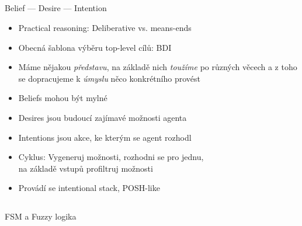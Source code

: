 \documentclass{beamer}
\begin{document}
\subsection{}
\begin{frame}{Belief --- Desire --- Intention}
\begin{itemize}
\item Practical reasoning: Deliberative vs. means-ends
\item Obecná šablona výběru top-level cílů: BDI
\item Máme nějakou {\em představu}, na základě nich {\em toužíme} po různých věcech a z toho se dopracujeme k {\em úmyslu} něco konkrétního provést
\item Beliefs mohou být mylné
\item Desires jsou budoucí zajímavé možnosti agenta
\item Intentions jsou akce, ke kterým se agent rozhodl
\item Cyklus: Vygeneruj možnosti, rozhodni se pro jednu, \\ na základě vstupů profiltruj možnosti
\item Provádí se intentional stack, POSH-like
\end{itemize}
\end{frame}

\subsection{}
\begin{frame}{FSM a Fuzzy logika}
\end{frame}
\end{document}
